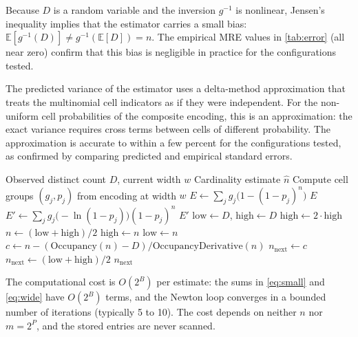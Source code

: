 \documentclass[11pt,letterpaper]{article}
\begin{document}
Because $D$ is a random variable and the inversion $g^{-1}$ is
nonlinear, Jensen's inequality implies that the estimator carries a
small bias: $\mathbb{E}[g^{-1}(D)] \neq g^{-1}(\mathbb{E}[D]) = n$.
The empirical MRE values in \autoref{tab:error} (all near zero)
confirm that this bias is negligible in practice for the
configurations tested.

The predicted variance of the estimator uses a delta-method
approximation that treats the multinomial cell indicators as if they
were independent. For the non-uniform cell probabilities of the
composite encoding, this is an approximation: the exact variance
requires cross terms between cells of different probability. The
approximation is accurate to within a few percent for the
configurations tested, as confirmed by comparing predicted and
empirical standard errors.

\begin{algorithm}
\caption{Occupancy-inversion estimator}
\label{alg:occupancy}
\begin{algorithmic}[1]
\Require Observed distinct count $D$, current width $w$
\Ensure Cardinality estimate $\hat{n}$
\State Compute cell groups $(g_j, p_j)$ from encoding at width $w$
  \State $E \gets \sum_j g_j \bigl(1 - (1 - p_j)^n\bigr)$
  \State \Return $E$
\EndFunction
{}
  \State $E' \gets \sum_j g_j \bigl(-\ln(1 - p_j)\bigr) (1 - p_j)^n$
  \State \Return $E'$
\EndFunction
\State $\text{low} \gets D$, $\text{high} \gets D$
  \State $\text{high} \gets 2 \cdot \text{high}$
\EndWhile
\State $n \gets (\text{low} + \text{high}) / 2$
\Repeat
    \State $\text{high} \gets n$
  \Else
    \State $\text{low} \gets n$
  \EndIf
  \State $c \gets n - (\text{Occupancy}(n) - D) / \text{OccupancyDerivative}(n)$
    \State $n_{\text{next}} \gets c$
  \Else
    \State $n_{\text{next}} \gets (\text{low} + \text{high}) / 2$
  \EndIf
{}
\State \Return $n_{\text{next}}$
\end{algorithmic}
\end{algorithm}

The computational cost is $O(2^B)$ per estimate: the sums in
\eqref{eq:small} and \eqref{eq:wide} have $O(2^B)$ terms, and the
Newton loop converges in a bounded number of iterations (typically 5 to 10).
The cost depends on neither $n$ nor $m = 2^P$, and the stored entries
are never scanned.
\end{document}
